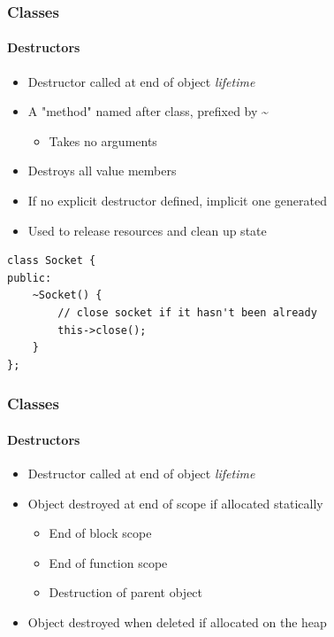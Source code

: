 \documentclass[table]{beamer}
\newcommand{\declarelesson}{\textbf{\color{themegreen}{Lesson:}} }
\begin{document}

\begin{frame}[fragile]
    \frametitle{\declarelesson Classes}
    \framesubtitle{Destructors}
    \begin{itemize}
        \item Destructor called at end of object \emph{lifetime}
        \item A "method" named after class, prefixed by \textasciitilde
            \begin{itemize}
                \item Takes no arguments
            \end{itemize}
        \item Destroys all value members
        \item If no explicit destructor defined, implicit one generated
        \item Used to release resources and clean up state
    \end{itemize}
    \begin{lstlisting}[title=Cleanup in destructor]
class Socket {
public:
    ~Socket() {
        // close socket if it hasn't been already
        this->close();
    }
};
    \end{lstlisting}
\end{frame}

\begin{frame}
    \frametitle{\declarelesson Classes}
    \framesubtitle{Destructors}
    \begin{itemize}
        \item Destructor called at end of object \emph{lifetime}
        \item Object destroyed at end of scope if allocated statically
            \begin{itemize}
                \item End of block scope
                \item End of function scope
                \item Destruction of parent object
            \end{itemize}
        \item Object destroyed when deleted if allocated on the heap
    \end{itemize}
\end{frame}
\end{document}
